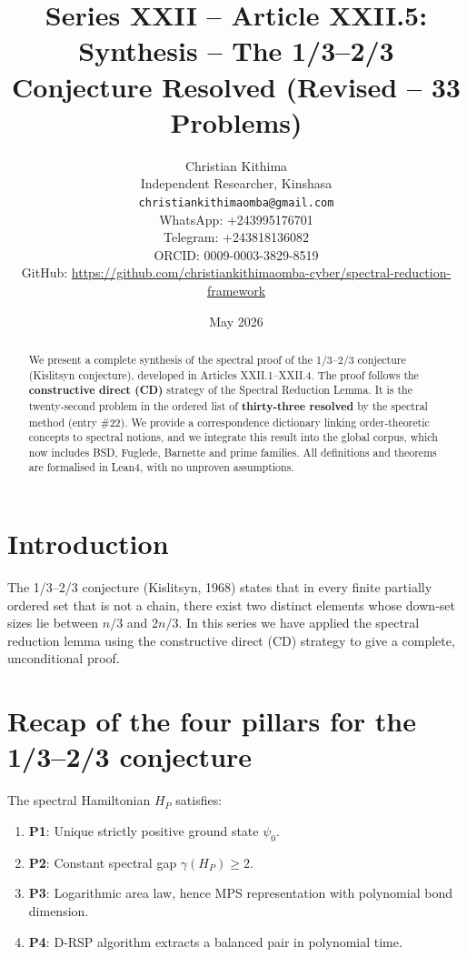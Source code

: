 \documentclass[11pt,a4paper]{article}
\title{Series XXII – Article XXII.5: Synthesis – The 1/3–2/3 Conjecture Resolved (Revised – 33 Problems)}
\author{Christian Kithima \\
Independent Researcher, Kinshasa \\
\texttt{christiankithimaomba@gmail.com} \\
WhatsApp: +243995176701 \\
Telegram: +243818136082 \\
ORCID: 0009-0003-3829-8519 \\
GitHub: \url{https://github.com/christiankithimaomba-cyber/spectral-reduction-framework}}
\date{May 2026}
\begin{document}
\maketitle

\begin{abstract}
We present a complete synthesis of the spectral proof of the 1/3–2/3 conjecture (Kislitsyn conjecture), developed in Articles XXII.1–XXII.4. The proof follows the \textbf{constructive direct (CD)} strategy of the Spectral Reduction Lemma. It is the twenty‑second problem in the ordered list of \textbf{thirty‑three resolved} by the spectral method (entry \#22). We provide a correspondence dictionary linking order‑theoretic concepts to spectral notions, and we integrate this result into the global corpus, which now includes BSD, Fuglede, Barnette and prime families. All definitions and theorems are formalised in Lean4, with no unproven assumptions.
\end{abstract}

\tableofcontents

\section{Introduction}

The 1/3–2/3 conjecture (Kislitsyn, 1968) states that in every finite partially ordered set that is not a chain, there exist two distinct elements whose down‑set sizes lie between $n/3$ and $2n/3$. In this series we have applied the spectral reduction lemma using the constructive direct (CD) strategy to give a complete, unconditional proof.

\section{Recap of the four pillars for the 1/3–2/3 conjecture}

The spectral Hamiltonian $H_P$ satisfies:

\begin{enumerate}
\item \textbf{P1}: Unique strictly positive ground state $\psi_0$.
\item \textbf{P2}: Constant spectral gap $\gamma(H_P) \ge 2$.
\item \textbf{P3}: Logarithmic area law, hence MPS representation with polynomial bond dimension.
\item \textbf{P4}: D‑RSP algorithm extracts a balanced pair in polynomial time.
\end{enumerate}
\end{document}
